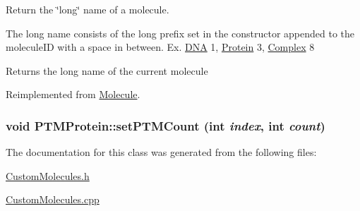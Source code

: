 Return the \char`\"{}long\char`\"{} name of a molecule.

The long name consists of the long prefix set in the constructor appended to the moleculeID with a space in between. Ex. \hyperlink{classDNA}{DNA} 1, \hyperlink{classProtein}{Protein} 3, \hyperlink{classComplex}{Complex} 8

\begin{DoxyReturn}{Returns}
the long name of the current molecule 
\end{DoxyReturn}


Reimplemented from \hyperlink{classMolecule_a6d3c3fd4827a62dacfd9d7a7d3a7f6ea}{Molecule}.\hypertarget{classPTMProtein_a7ce484e1d24adb5cf50ef07c6004d386}{
\subsubsection[{setPTMCount}]{\setlength{\rightskip}{0pt plus 5cm}void PTMProtein::setPTMCount (int {\em index}, \/  int {\em count})}}
\label{classPTMProtein_a7ce484e1d24adb5cf50ef07c6004d386}


The documentation for this class was generated from the following files:\begin{DoxyCompactItemize}
\item 
\hyperlink{CustomMolecules_8h}{CustomMolecules.h}\item 
\hyperlink{CustomMolecules_8cpp}{CustomMolecules.cpp}\end{DoxyCompactItemize}
